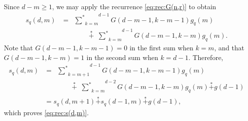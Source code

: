 \documentclass[a4paper,11pt]{amsart}
\theoremstyle{definition}
\newenvironment{demo}[1]{%
  \trivlist
  \item[\hskip\labelsep
        {\bf #1.}]
}{%
\hfill\qedsymbol
  \endtrivlist
}
\newcommand{\nimadd}{\overset{*}{+}}
\newcommand{\nimsum}{{\sum}^{*}}
\numberwithin{equation}{section}
\begin{document}
%
\begin{demo}{Proof}
%
Since $d-m\geq1$,
we may apply the recurrence \eqref{eq:rec:G(n,r)} to obtain
%
\begin{align*}
s_{q}(d,m)
&=\overset{d-1}{\underset{k=m}{\,\,\,\nimsum}} G(d-m-1,k-m-1) g_{q}(m)
\\&\qquad\qquad
\nimadd\overset{d-1}{\underset{k=m}{\,\,\,\nimsum}} G(d-m-1,k-m) g_{q}(m).
\end{align*}
%
Note that $G(d-m-1,k-m-1)=0$ in the first sum when $k=m$,
and that $G(d-m-1,k-m)=1$ in the second sum when $k=d-1$.
%
Therefore, 
\begin{align*}
s_{q}(d,m)
&=\overset{d-1}{\underset{k=m+1}{\,\,\,\nimsum}} G(d-m-1,k-m-1) g_{q}(m)
\\&\qquad\qquad
\nimadd\overset{d-2}{\underset{k=m}{\,\,\,\nimsum}} G(d-m-1,k-m) g_{q}(m)
\nimadd g(d-1)
\\&=s_{q}(d,m+1)\nimadd s_{q}(d-1,m)\nimadd g(d-1),
\end{align*}
%
which proves \eqref{eq:rec:s(d,m)}.
%
\end{demo}
%
%
%
\end{document}

